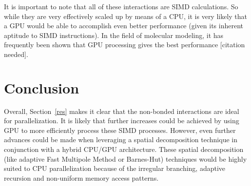 \documentclass[conference]{IEEEtran}
\begin{document}
It is important to note that all of these
interactions are SIMD calculations. So while they are very effectively scaled up by means of a CPU, it is very likely
that a GPU would be able to accomplish even better performance (given its inherent aptitude to SIMD instructions). 
In the field of molecular modeling, it has frequently been shown that GPU processing gives the best performance [citation needed].

\section{Conclusion}
Overall, Section~\ref{res} makes it clear that the non-bonded interactions are ideal for parallelization. It is likely
that further increases could be achieved by using GPU to more efficiently process these SIMD processes. However,
even further advances could be made when leveraging a spatial decomposition technique in conjunction with a hybrid
CPU/GPU architecture. These spatial decomposition (like adaptive Fast Multipole Method or Barnes-Hut) techniques would be 
highly suited to CPU parallelization because of the irregular branching, adaptive recursion and non-uniform memory
access patterns. 





\end{document}
